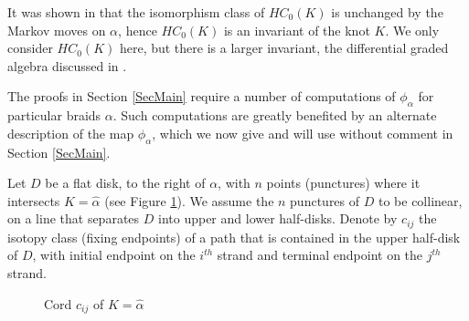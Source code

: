 \documentclass[11pt]{amsart}
\theoremstyle{definition}
\begin{document}
  It was shown in \cite{Ng08} that the isomorphism class of $HC_0(K)$ is unchanged by the Markov moves on $\alpha$, hence $HC_0(K)$ is an invariant of the knot $K$. We only consider $HC_0(K)$ here, but there is a larger invariant, the differential graded algebra discussed in \cite{Ng12}.

  The proofs in Section \ref{SecMain} require a number of computations of $\phi_\alpha$ for particular braids $\alpha$. Such computations are greatly benefited by an alternate description of the map $\phi_\alpha$, which we now give and will use without comment in Section \ref{SecMain}.

  Let $D$ be a flat disk, to the right of $\alpha$, with $n$ points (punctures) where it intersects $K=\hat{\alpha}$ (see Figure \ref{FigA_nGens}). We assume the $n$ punctures of $D$ to be collinear, on a line that separates $D$ into upper and lower half-disks. Denote by $c_{ij}$ the isotopy class (fixing endpoints) of a path that is contained in the upper half-disk of $D$, with initial endpoint on the $i^{th}$ strand and terminal endpoint on the $j^{th}$ strand.

  \begin{figure}[ht]
\caption{Cord $c_{ij}$ of $K=\hat \alpha$}
\label{FigA_nGens}
\end{figure}
\end{document}
